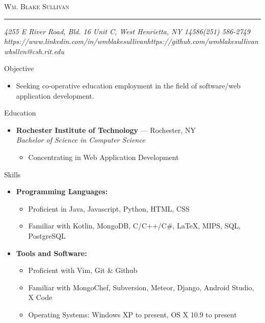 \documentclass[10pt,oneside]{article}
\makeatletter
\newcommand{\name}{Wm. Blake Sullivan}
\newcommand{\addr}{4255 E River Road, Bld. 16 Unit C, West Henrietta, NY 14586}
\newcommand{\phone}{(251) 586-2749}
\newcommand{\email}{wbsllvn@csh.rit.edu}
\newcommand{\github}{https://github.com/wmblakesullivan}
\newcommand{\linkedin}{https://www.linkedin.com/in/wmblakesullivan}
\newcommand{\bigname}[1]{
	\begin{center}\fontfamily{bch}\selectfont\Huge\scshape#1\end{center}
}
\newenvironment{ressection}[1]{
	\vspace{3pt}
	{\fontfamily{bch}\selectfont\Large#1}
	\begin{itemize}
	\vspace{2pt}
}{
	\end{itemize}
}
\newcommand{\resitem}[1]{
	\vspace{-2pt}
	\item \begin{flushleft} #1 \end{flushleft}
}
\newcommand{\ressubitem}[1]{
	\vspace{-1pt}
	\item \begin{flushleft} #1 \end{flushleft}
}
\newcommand{\resbigitem}[3]{
	\vspace{-3pt}
	\item
	\textbf{#1} --- #2 \\
	\textit{#3}
}
\newenvironment{ressubsec}[3]{
	\resbigitem{#1}{#2}{#3}
	\vspace{-1pt}
	\begin{itemize}
}{
	\end{itemize}
}
\newenvironment{reslist}[1]{
	\resitem{\textbf{#1}}
	\vspace{-3pt}
	\begin{itemize}
}{
	\end{itemize}
}
\makeatother
\begin{document}
 \selectfont

\bigname{\name}

\vspace{-4pt} \rule{\textwidth}{1pt}

\vspace{-1pt} {\normalsize\itshape \addr \hfill \phone \\ \linkedin \hfill \github \\ \email}

\vspace{15 pt}



  \begin{ressection}{Objective}

  	\ressubitem{Seeking co-operative education employment in the field of software/web application development.}

  \end{ressection}


\begin{ressection}{Education}

	\begin{ressubsec}{Rochester Institute of Technology}{Rochester, NY}{Bachelor of Science in Computer Science}
		\ressubitem{Concentrating in Web Application Development}
	\end{ressubsec}

\end{ressection}


\begin{ressection}{Skills}


	\begin{reslist}{Programming Languages:}
		\ressubitem{Proficient in Java, Javascript, Python, HTML, CSS}
		\ressubitem{Familiar with Kotlin, MongoDB, C/C++/C\#, \LaTeX, MIPS, SQL, PostgreSQL}
	\end{reslist}

	\begin{reslist}{Tools and Software:}
		\ressubitem{Proficient with Vim, Git \& Github}
		\ressubitem{Familiar with MongoChef, Subversion, Meteor, Django, Android Studio, X Code}
		\ressubitem{Operating Systems: Windows XP to present, OS X 10.9 to present}
	\end{reslist}

\end{ressection}
\end{document}
